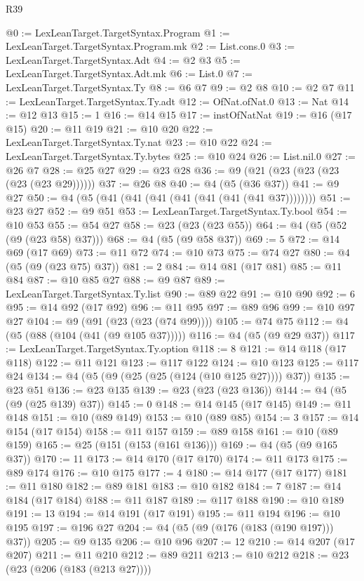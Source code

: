 \begin{lexlean}{R39}
\begin{coremodule}
@0 := LexLeanTarget.TargetSyntax.Program
@1 := LexLeanTarget.TargetSyntax.Program.mk
@2 := List.cons.{0}
@3 := LexLeanTarget.TargetSyntax.Adt
@4 := @2 @3
@5 := LexLeanTarget.TargetSyntax.Adt.mk
@6 := List.{0}
@7 := LexLeanTarget.TargetSyntax.Ty
@8 := @6 @7
@9 := @2 @8
@10 := @2 @7
@11 := LexLeanTarget.TargetSyntax.Ty.adt
@12 := OfNat.ofNat.{0}
@13 := Nat
@14 := @12 @13
@15 := 1
@16 := @14 @15
@17 := instOfNatNat
@19 := @16 (@17 @15)
@20 := @11 @19
@21 := @10 @20
@22 := LexLeanTarget.TargetSyntax.Ty.nat
@23 := @10 @22
@24 := LexLeanTarget.TargetSyntax.Ty.bytes
@25 := @10 @24
@26 := List.nil.{0}
@27 := @26 @7
@28 := @25 @27
@29 := @23 @28
@36 := @9 (@21 (@23 (@23 (@23 (@23 (@23 @29))))))
@37 := @26 @8
@40 := @4 (@5 (@36 @37))
@41 := @9 @27
@50 := @4 (@5 (@41 (@41 (@41 (@41 (@41 (@41 (@41 @37))))))))
@51 := @23 @27
@52 := @9 @51
@53 := LexLeanTarget.TargetSyntax.Ty.bool
@54 := @10 @53
@55 := @54 @27
@58 := @23 (@23 (@23 @55))
@64 := @4 (@5 (@52 (@9 (@23 @58) @37)))
@68 := @4 (@5 (@9 @58 @37))
@69 := 5
@72 := @14 @69 (@17 @69)
@73 := @11 @72
@74 := @10 @73
@75 := @74 @27
@80 := @4 (@5 (@9 (@23 @75) @37))
@81 := 2
@84 := @14 @81 (@17 @81)
@85 := @11 @84
@87 := @10 @85 @27
@88 := @9 @87
@89 := LexLeanTarget.TargetSyntax.Ty.list
@90 := @89 @22
@91 := @10 @90
@92 := 6
@95 := @14 @92 (@17 @92)
@96 := @11 @95
@97 := @89 @96
@99 := @10 @97 @27
@104 := @9 (@91 (@23 (@23 (@74 @99))))
@105 := @74 @75
@112 := @4 (@5 (@88 (@104 (@41 (@9 @105 @37)))))
@116 := @4 (@5 (@9 @29 @37))
@117 := LexLeanTarget.TargetSyntax.Ty.option
@118 := 8
@121 := @14 @118 (@17 @118)
@122 := @11 @121
@123 := @117 @122
@124 := @10 @123
@125 := @117 @24
@134 := @4 (@5 (@9 (@25 (@25 (@124 (@10 @125 @27)))) @37))
@135 := @23 @51
@136 := @23 @135
@139 := @23 (@23 (@23 @136))
@144 := @4 (@5 (@9 (@25 @139) @37))
@145 := 0
@148 := @14 @145 (@17 @145)
@149 := @11 @148
@151 := @10 (@89 @149)
@153 := @10 (@89 @85)
@154 := 3
@157 := @14 @154 (@17 @154)
@158 := @11 @157
@159 := @89 @158
@161 := @10 (@89 @159)
@165 := @25 (@151 (@153 (@161 @136)))
@169 := @4 (@5 (@9 @165 @37))
@170 := 11
@173 := @14 @170 (@17 @170)
@174 := @11 @173
@175 := @89 @174
@176 := @10 @175
@177 := 4
@180 := @14 @177 (@17 @177)
@181 := @11 @180
@182 := @89 @181
@183 := @10 @182
@184 := 7
@187 := @14 @184 (@17 @184)
@188 := @11 @187
@189 := @117 @188
@190 := @10 @189
@191 := 13
@194 := @14 @191 (@17 @191)
@195 := @11 @194
@196 := @10 @195
@197 := @196 @27
@204 := @4 (@5 (@9 (@176 (@183 (@190 @197))) @37))
@205 := @9 @135
@206 := @10 @96
@207 := 12
@210 := @14 @207 (@17 @207)
@211 := @11 @210
@212 := @89 @211
@213 := @10 @212
@218 := @23 (@23 (@206 (@183 (@213 @27))))

\end{coremodule}
\end{lexlean}
